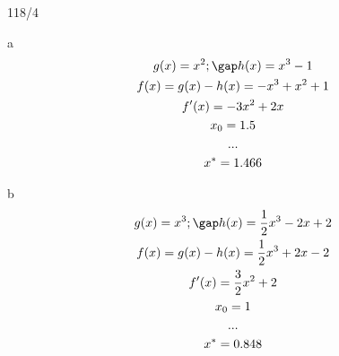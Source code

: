 \begin{exercise}{118/4}
  \item [a]
  \begin{gather*}
    g(x) = x^2; \gap h(x) = x^3 - 1 \\
    f(x) = g(x) - h(x) = -x^3 + x^2 + 1 \\
    f'(x) = -3x^2 + 2x \\
    x_0 = 1.5 \\
    ... \\
    x^\ast = 1.466
  \end{gather*}
  \item [b]
  \begin{gather*}
    g(x) = x^3; \gap h(x) = \frac{1}{2}x^3 - 2x + 2 \\
    f(x) = g(x) - h(x) = \frac{1}{2}x^3 + 2x - 2 \\
    f'(x) = \frac{3}{2}x^2 + 2 \\
    x_0 = 1 \\
    ... \\
    x^\ast = 0.848
  \end{gather*}
\end{exercise}
\newpage

